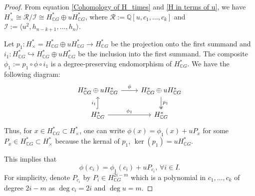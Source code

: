 \documentclass{amsart}
\begin{document}
	\begin{proof}
		From equation \eqref{Cohomology of H_times} and \eqref{H in terms of u}, we have $H^*_{\times}\cong \mathcal R/\mathcal I \cong H^*_{\mathbb{C}G} \oplus u H^*_{\mathbb{C}G}$, where $\mathcal R:=\mathbb Q[u,c_1,\ldots,c_k]$ and $\mathcal I:=\langle u^2, h_{n-k+1},\ldots,h_n\rangle$.
		
		Let $p_1: H^*_{\times} = H^*_{\mathbb{C}G} \oplus u H^*_{\mathbb{C}G} \to H^*_{\mathbb{C}G}$ be the projection onto the first summand and $i_1: H^*_{\mathbb{C}G} \hookrightarrow H^*_{\mathbb{C}G} \oplus u H^*_{\mathbb{C}G}$ be the inclusion into the first summand. The composite $\phi_1:= p_1 \circ \phi \circ i_1$ is a degree-preserving endomorphism of $H^*_{\mathbb{C}G}$. We have the following diagram:
		\begin{equation}\label{comm diagram}
			\begin{tikzcd}
				{H^*_{\mathbb CG}\oplus u H^*_{\mathbb CG}} & {H^*_{\mathbb CG} \oplus u H^*_{\mathbb CG}} \\
				{H^*_{\mathbb CG}} & {H^*_{\mathbb CG}}
				\arrow["\phi", from=1-1, to=1-2]
				\arrow["{p_1}", two heads, from=1-2, to=2-2]
				\arrow["{i_1}", hook, from=2-1, to=1-1]
				\arrow["{\phi_1}", from=2-1, to=2-2]
			\end{tikzcd}
		\end{equation}
		Thus, for  $x \in H^*_{\mathbb{C}G} \subset H^*_\times$, one can write
		$\phi(x) = \phi_1(x) + u P_x$
		for some $P_x \in H^*_{\mathbb{C}G} \subset H^*_\times$ because the kernal of $p_1$, $\ker(p_1) = u H^*_{\mathbb{C}G}$.

		This implies that \begin{equation}\label{defn of phi}
			\phi(c_i) = \phi_1(c_i) + u P_{c_i},\, \forall i \in I.
		\end{equation} For simplicity, denote $P_{c_i}$ by $P_i\in H^{2i-m}_{\mathbb CG}$ which is a polynomial in $c_1, \dots, c_k$ of degree $2i - m$ as $\deg c_i = 2i$ and $\deg u = m$.
		

\end{proof}
\end{document}
